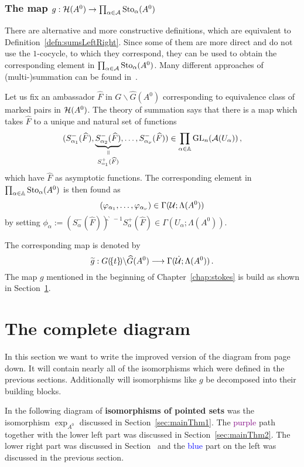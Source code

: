 \subsubsection{The map
  $g:\mathcal{H}(A^0)\to\prod_{\alpha\in\mathcal{A}}\operatorname{Sto}_\alpha(A^0)$}\label{sect:multisummmap}
There are alternative and more constructive definitions, which are equivalent to
Definition~\ref{defn:sumsLeftRight}.
Since some of them are more direct and do not use the $1$-cocycle, to which they
correspond, they can be used to obtain the corresponding
element in $\prod_{\alpha\in\mathcal{A}}\operatorname{Sto}_\alpha(A^0)$.
Many different approaches of (multi-)summation can be found in~\cite{Loday2014}.

Let us fix an ambassador $\hat F$ in $G\backslash\hat G(A^0)$ corresponding to
equivalence class of marked pairs in $\mathcal{H}(A^0)$.
The theory of summation says that there is a map which takes $\hat F$ to a
unique and natural set of functions
\[
  (S_{\alpha_1}^-(\hat F),
  \underset{S_{\alpha_1}^+(\hat F)}{
    \underset{\text{\rotatebox[origin=c]{-90}{$=$}}}{\underbrace{
        S_{\alpha_2}^-(\hat F)
      }}}
  ,\dots,S_{\alpha_\nu}^-(\hat F))\in
  \prod_{\alpha\in\A}\Gl_n(\cA(U_\alpha)) \,,
\]
which have $\hat F$ as asymptotic functions.
The corresponding element in $\prod_{\alpha\in\mathbb{A}}\operatorname{Sto}_\alpha(A^0)$ is then found
as
\[
  (\varphi_{\alpha_1},\dots,\varphi_{\alpha_\nu})
  \in\Gamma(\mathcal{U};\Lambda(A^0))
\]
by setting $\phi_\alpha:=
\left(S^-_\alpha(\hat F)\right)̂^{̀-1}S^+_\alpha(\hat F)\in\Gamma(U_\alpha;\Lambda(A^0))$.
\begin{defn}\label{defn:theMapG}
  The corresponding map is denoted by
  \[
    \widetilde g:G(\!\{t\}\!)\backslash\widehat G(A^0)
    \longrightarrow
    \Gamma(\dot{\mathcal{U}};\Lambda(A^0)) \,.
  \]
  The map $g$ mentioned in the beginning of Chapter~\ref{chap:stokes} is build
  as shown in Section~\ref{sec:theCompleteDiagram}.
\end{defn}
\section{The complete diagram}\label{sec:theCompleteDiagram}
In this section we want to write the improved version of the diagram from
page~\pageref{page:ofPreDiagram} down. It will contain nearly all of the
isomorphisms which were defined in the previous sections. Additionally will
isomorphisms like $g$ be decomposed into their building blocks.

In the following diagram of \textbf{isomorphisms of pointed sets} was the
isomorphism $\exp_{A^0}$ discussed in Section~\ref{sec:mainThm1}. The
\textcolor{purple}{purple} path together with the lower left part was discussed
in Section~\ref{sec:mainThm2}. The lower right part was discussed in
Section~\label{sec:furtherImprovements} and the \textcolor{blue}{blue} part on
the left was discussed in the previous section.

